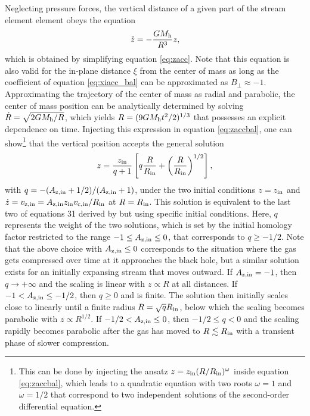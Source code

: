 \documentclass[a4paper,fleqn,usenatbib]{mnras}
\newcommand{\be}{\begin{equation}}
\newcommand{\ee}{\end{equation}}
\newcommand{\mh}{M_{\rm h}}
\begin{document}
Neglecting pressure forces, the vertical distance of a given part of the stream element element obeys the equation
\be
\ddot{z} = -\frac{G \mh}{R^3} z,
\label{eq:zaccbal}
\ee
which is obtained by simplifying equation \eqref{eq:zacc}. Note that this equation is also valid for the in-plane  distance $\xi$ from the center of mass as long as the coefficient of equation \eqref{eq:xiacc_bal} can be approximated as $B_{\perp} \approx -1$. Approximating the trajectory of the center of mass as radial and parabolic, the center of mass position can be analytically determined by solving $\dot{R} = \sqrt{2 G \mh / R}$, which yields $R =  (9 G \mh t^2 /2)^{1/3}$ that possesses an explicit dependence on time. Injecting this expression in equation \eqref{eq:zaccbal}, one can show\footnote{This can be done by injecting the ansatz $z =z_{\rm in} (R/R_{\rm in})^{\omega}$ inside equation \eqref{eq:zaccbal}, which leads to a quadratic equation with two roots $\omega = 1$ and $\omega = 1/2$ that correspond to two independent solutions of the second-order differential equation.} that the vertical position accepts the general solution
\be
z = \frac{z_{\rm in}}{q+1} \left[ q \frac{R}{R_{\rm in}} + \left(\frac{R}{R_{\rm in}} \right)^{1/2}   \right],
\label{eq:zaccbalsol}
\ee
with $q = -(A_{\rm z,in} + 1/2)/ (A_{\rm z,in} + 1)$, under the two initial conditions $z = z_{\rm in}$ and $\dot{z} = v_{\rm z,in} = A_{\rm z,in} z_{\rm in} v_{\rm c,  in}/ R_{\rm in}$ at $R = R_{\rm in}$. This solution is equivalent to the last two of equations 31 derived by \cite{sari2010} but using specific initial conditions. Here, $q$ represents the weight of the two solutions, which is set by the initial homology factor restricted to the range $-1 \leq A_{\rm z,in} \leq 0$, that corresponds to $q \geq -1/2 $. Note that the above choice with $A_{\rm z,in}\leq0$ corresponds to the situation where the gas gets compressed over time at it approaches the black hole, but a similar solution exists for an initially expansing stream that moves outward. If $A_{\rm z,in} = -1$, then $q \rightarrow + \infty$ and the scaling is linear with $z\propto R$ at all distances. If $-1< A_{\rm z,in} \leq -1/2$, then $q \geq 0$ and is finite. The solution then initially scales close to linearly until a finite radius $R = \sqrt{q} R_{\rm in}$, below which the scaling becomes parabolic with $z\propto R^{1/2}$. If $-1/2 < A_{\rm z,in} \leq 0$, then $-1/2 \leq q < 0$ and the scaling rapidly becomes parabolic after the gas has moved to $R \lesssim R_{\rm in}$ with a transient phase of slower compression.
\end{document}
